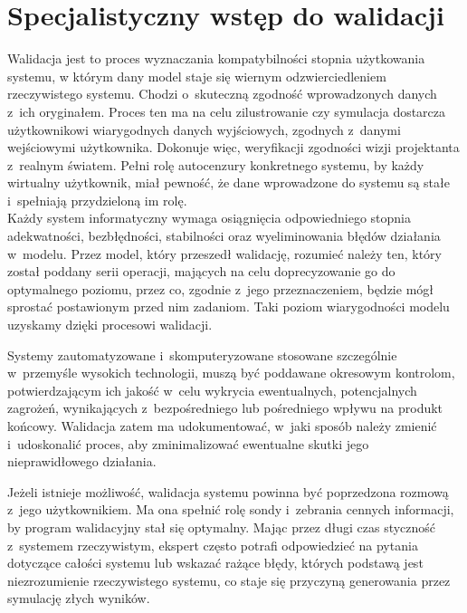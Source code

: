 \documentclass{xmgr}
\begin{document}
\section{Specjalistyczny wstęp do walidacji}

\indent \indent \indent \textcolor{sb}{Walidacja jest to proces wyznaczania kompatybilności stopnia użytkowania systemu,} \textcolor{sa}{w którym dany model staje się wiernym odzwierciedleniem rzeczywistego systemu.} \textcolor{sb}{Chodzi o~skuteczną zgodność wprowadzonych danych z~ich oryginałem.} \textcolor{sa}{Proces ten ma na celu zilustrowanie czy symulacja dostarcza użytkownikowi wiarygodnych danych wyjściowych, zgodnych z~danymi wejściowymi użytkownika. Dokonuje więc, weryfikacji zgodności wizji projektanta z~realnym światem. Pełni rolę autocenzury konkretnego systemu, by każdy wirtualny użytkownik, miał pewność, że dane wprowadzone do systemu są stałe i~spełniają przydzieloną im rolę.}
\\
\indent \textcolor{sb}{Każdy system informatyczny wymaga osiągnięcia odpowiedniego stopnia adekwatności, bezbłędności, stabilności oraz wyeliminowania błędów działania w~modelu}. \textcolor{sa}{Przez model, który przeszedł walidację, rozumieć należy ten, który został poddany serii operacji,} \textcolor{sa}{mających na celu doprecyzowanie go do optymalnego poziomu, przez co, zgodnie z~jego przeznaczeniem, będzie mógł sprostać postawionym przed nim zadaniom. Taki poziom wiarygodności modelu uzyskamy dzięki procesowi walidacji.}

\textcolor{sb}{Systemy zautomatyzowane i~skomputeryzowane stosowane szczególnie w~przemyśle wysokich technologii, muszą być poddawane okresowym kontrolom,} \textcolor{sa}{potwierdzającym ich jakość w~celu wykrycia ewentualnych, potencjalnych zagrożeń, wynikających z~bezpośredniego lub pośredniego wpływu na produkt końcowy. Walidacja zatem ma udokumentować, w~jaki sposób należy zmienić i~udoskonalić proces, aby zminimalizować ewentualne skutki jego nieprawidłowego działania.}

\textcolor{sb}{Jeżeli istnieje możliwość, walidacja systemu powinna być poprzedzona rozmową z~jego użytkownikiem.} \textcolor{sa}{Ma ona spełnić rolę sondy i~zebrania cennych informacji, by program walidacyjny stał się optymalny.} \textcolor{sb}{Mając przez długi czas styczność z~systemem rzeczywistym, ekspert często potrafi odpowiedzieć na pytania dotyczące całości systemu lub wskazać rażące błędy,} \textcolor{sa}{których podstawą jest niezrozumienie rzeczywistego systemu, co staje się przyczyną generowania przez symulację złych wyników.} \cite{Validation}
\end{document}
